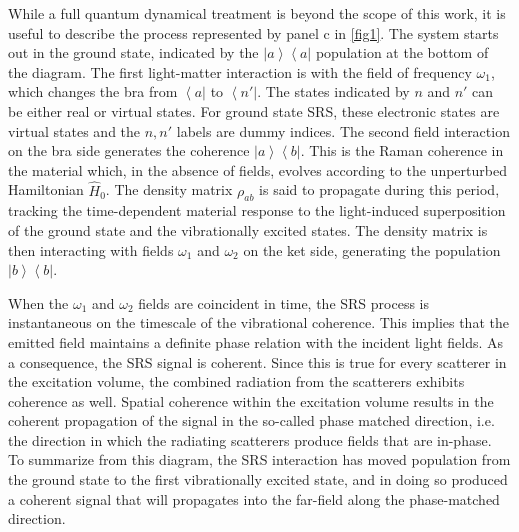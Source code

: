 While a full quantum dynamical treatment is beyond the scope of this work, it is useful to describe the process represented by panel c in \ref{fig1}. The system starts out in the ground state, indicated by the $\left|a\right>\left<a\right|$ population at the bottom of the diagram. The first light-matter interaction is with the field of frequency $\omega_1$, which changes the bra from $\left<a\right|$ to $\left<n'\right|$. The states indicated by $n$ and $n'$ can be either real or virtual states. For ground state SRS, these electronic states are virtual states and the $n,n'$ labels are dummy indices. The second field interaction on the bra side generates the coherence $\left|a\right>\left<b\right|$. This is the Raman coherence in the material which, in the absence of fields, evolves according to the unperturbed Hamiltonian $\hat{H}_0$. The density matrix $\rho_{ab}$ is said to propagate during this period, tracking the time-dependent material response to the light-induced superposition of the ground state and the vibrationally excited states. The density matrix is then interacting with fields $\omega_1$ and $\omega_2$ on the ket side, generating the population $\left|b\right>\left<b\right|$.

When the $\omega_1$ and $\omega_2$ fields are coincident in time, the SRS process is instantaneous on the timescale of the vibrational coherence. This implies that the emitted field maintains a definite phase relation with the incident light fields. As a consequence, the SRS signal is coherent. Since this is true for every scatterer in the excitation volume, the combined radiation from the scatterers exhibits coherence as well. Spatial coherence within the excitation volume results in the coherent propagation of the signal in the so-called phase matched direction, i.e. the direction in which the radiating scatterers produce fields that are in-phase. To summarize from this diagram, the SRS interaction has moved population from the ground state to the first vibrationally excited state, and in doing so produced a coherent signal that will propagates into the far-field along the phase-matched direction. 

